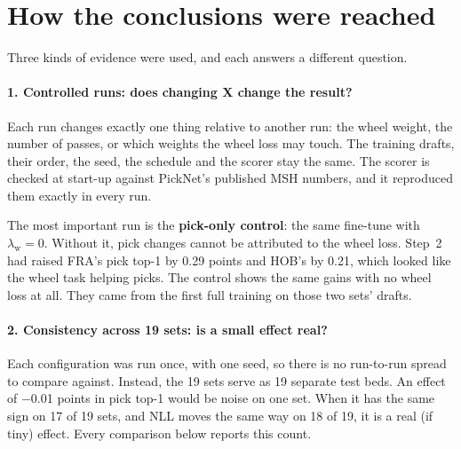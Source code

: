\documentclass[11pt,letterpaper]{article}
\newcommand{\lw}{\lambda_{\text{w}}}
\begin{document}
\section{How the conclusions were reached}\label{sec:method}

Three kinds of evidence were used, and each answers a different question.

\paragraph{1. Controlled runs: does changing X change the result?} Each run changes exactly one thing relative to
another run: the wheel weight, the number of passes, or which weights the wheel loss may touch. The training
drafts, their order, the seed, the schedule and the scorer stay the same. The scorer is checked at start-up
against PickNet's published MSH numbers, and it reproduced them exactly in every run.

The most important run is the \textbf{pick-only control}: the same fine-tune with $\lw=0$. Without it, pick
changes cannot be attributed to the wheel loss. Step~2 had raised FRA's pick top-1 by 0.29 points and HOB's by
0.21, which looked like the wheel task helping picks. The control shows the same gains with no wheel loss at all.
They came from the first full training on those two sets' drafts.

\paragraph{2. Consistency across 19 sets: is a small effect real?} Each configuration was run once, with one
seed, so there is no run-to-run spread to compare against. Instead, the 19 sets serve as 19 separate test beds.
An effect of $-$0.01 points in pick top-1 would be noise on one set. When it has the same sign on 17 of 19 sets,
and NLL moves the same way on 18 of 19, it is a real (if tiny) effect. Every comparison below reports this count.
\end{document}

